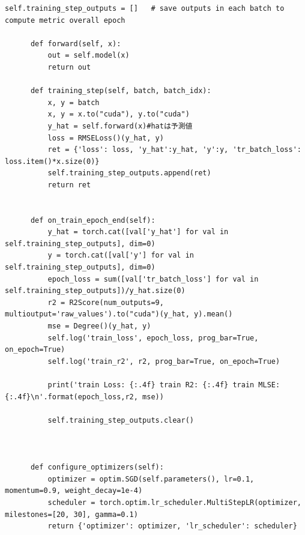 \documentclass[a4paper,11pt,dvipdfmx]{jreport}
\begin{document}
\begin{lstlisting}[caption=印象判定用NN{,} DenseNetに関するソースコード, label=source]
          self.training_step_outputs = []   # save outputs in each batch to compute metric overall epoch
  
      def forward(self, x):
          out = self.model(x)
          return out
  
      def training_step(self, batch, batch_idx):
          x, y = batch
          x, y = x.to("cuda"), y.to("cuda")
          y_hat = self.forward(x)#hatは予測値
          loss = RMSELoss()(y_hat, y)
          ret = {'loss': loss, 'y_hat':y_hat, 'y':y, 'tr_batch_loss': loss.item()*x.size(0)}
          self.training_step_outputs.append(ret)
          return ret
  
  
      def on_train_epoch_end(self):
          y_hat = torch.cat([val['y_hat'] for val in self.training_step_outputs], dim=0)
          y = torch.cat([val['y'] for val in self.training_step_outputs], dim=0)
          epoch_loss = sum([val['tr_batch_loss'] for val in self.training_step_outputs])/y_hat.size(0)
          r2 = R2Score(num_outputs=9, multioutput='raw_values').to("cuda")(y_hat, y).mean()
          mse = Degree()(y_hat, y)
          self.log('train_loss', epoch_loss, prog_bar=True, on_epoch=True)
          self.log('train_r2', r2, prog_bar=True, on_epoch=True)
  
          print('train Loss: {:.4f} train R2: {:.4f} train MLSE: {:.4f}\n'.format(epoch_loss,r2, mse))
  
          self.training_step_outputs.clear()
  
  
  
      def configure_optimizers(self):
          optimizer = optim.SGD(self.parameters(), lr=0.1, momentum=0.9, weight_decay=1e-4)
          scheduler = torch.optim.lr_scheduler.MultiStepLR(optimizer, milestones=[20, 30], gamma=0.1)
          return {'optimizer': optimizer, 'lr_scheduler': scheduler}
\end{lstlisting}
\newpage
{}
\renewcommand{\bibname}{参考文献}

%
%
\end{document}
